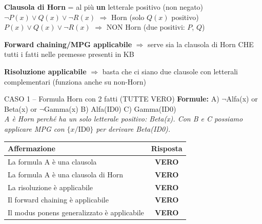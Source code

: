 \documentclass[12pt,a4paper]{article}
\newcommand{\V}{\textcolor{green!55!black}{\textbf{VERO}}}
\begin{document}
\begin{tcolorbox}[colback=yellow!8, colframe=orange!65!black, title=\textbf{Schema mentale per le formule FOL}, fonttitle=\bfseries]
\textbf{Clausola di Horn} = al più \textbf{un} letterale positivo (non negato)\\
\quad $\neg P(x) \lor Q(x) \lor \neg R(x)$ $\Rightarrow$ Horn (solo $Q(x)$ positivo) \checkmark\\
\quad $P(x) \lor Q(x) \lor \neg R(x)$ $\Rightarrow$ NON Horn (due positivi: $P$, $Q$) \texttimes

\vspace{4pt}
\textbf{Forward chaining/MPG applicabile} $\Rightarrow$ serve sia la clausola di Horn CHE tutti i fatti nelle premesse presenti in KB

\vspace{4pt}
\textbf{Risoluzione applicabile} $\Rightarrow$ basta che ci siano due clausole con letterali complementari (funziona anche su non-Horn)
\end{tcolorbox}

\vspace{6pt}

\begin{vftab}{CASO 1 -- Formula Horn con 2 fatti (TUTTE VERO)}
\textbf{Formule:} A) $\neg$Alfa(x) or Beta(x) or $\neg$Gamma(x) \quad B) Alfa(ID0) \quad C) Gamma(ID0)\\[4pt]
\textit{A è Horn perché ha un solo letterale positivo: Beta(x). Con B e C possiamo applicare MPG con $\{x/\text{ID0}\}$ per derivare Beta(ID0).}
\begin{center}
\renewcommand{\arraystretch}{1.3}
\begin{tabular}{lc}
\hline
\textbf{Affermazione} & \textbf{Risposta} \\
\hline
La formula A è una clausola & \V \\
La formula A è una clausola di Horn & \V \\
La risoluzione è applicabile & \V \\
Il forward chaining è applicabile & \V \\
Il modus ponens generalizzato è applicabile & \V \\
\hline
\end{tabular}
\end{center}
\end{vftab}

\vspace{6pt}
\end{document}
